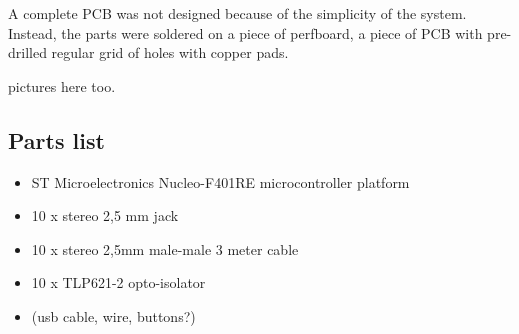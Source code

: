 A complete PCB was not designed because of the simplicity of the system.
Instead, the parts were soldered on a piece of perfboard, a piece of PCB with pre-drilled regular grid of holes with copper pads.

pictures here too.

\subsection{Parts list}

\begin{itemize}
	\item ST Microelectronics Nucleo-F401RE microcontroller platform
	\item 10 x stereo 2,5 mm jack
	\item 10 x stereo 2,5mm male-male 3 meter cable
	\item 10 x TLP621-2 opto-isolator
	\item (usb cable, wire, buttons?)
\end{itemize}
